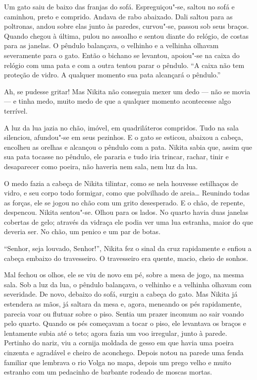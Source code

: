 Um gato saiu de baixo das franjas do sofá. Espreguiçou"-se, saltou no
sofá e caminhou, preto e comprido. Andava de rabo abaixado. Dali saltou
para as poltronas, andou sobre elas junto às paredes, curvou"-se, passou
sob seus braços. Quando chegou à última, pulou no assoalho e sentou
diante do relógio, de costas para as janelas. O pêndulo balançava, o
velhinho e a velhinha olhavam severamente para o gato. Então o bichano se
levantou, apoiou"-se na caixa do relógio com uma pata e com a outra
tentou parar o pêndulo. ``A caixa não tem proteção de vidro. A qualquer
momento sua pata alcançará o pêndulo.''

Ah, se pudesse gritar! Mas Nikita não conseguia mexer um dedo --- não se
movia --- e tinha medo, muito medo de que a qualquer momento acontecesse
algo terrível.

A luz da lua jazia no chão, imóvel, em quadriláteros compridos. Tudo na
sala silenciou, afundou"-se em seus pezinhos. E o gato se esticou,
abaixou a cabeça, encolheu as orelhas e alcançou o pêndulo com a pata.
Nikita sabia que, assim que sua pata tocasse no pêndulo, ele pararia e
tudo iria trincar, rachar, tinir e desaparecer como poeira, não haveria
nem sala, nem luz da lua.

O medo fazia a cabeça de Nikita tilintar, como se nela houvesse estilhaços de vidro, e seu corpo todo formigar, como que polvilhado de areia\ldots{} Reunindo todas as
forças, ele se jogou no chão com um grito desesperado. E o chão, de
repente, despencou. Nikita sentou"-se. Olhou para os lados. No quarto
havia duas janelas cobertas de gelo; através da vidraça ele podia ver uma
lua estranha, maior do que deveria ser. No chão, um penico e um par de
botas.

``Senhor, seja louvado, Senhor!'', Nikita fez o sinal da cruz
rapidamente e enfiou a cabeça embaixo do travesseiro. O travesseiro era
quente, macio, cheio de sonhos.

Mal fechou os olhos, ele se viu de novo em pé, sobre a mesa de jogo, na
mesma sala. Sob a luz da lua, o pêndulo balançava, o velhinho e a
velhinha olhavam com severidade. De novo, debaixo do sofá, surgiu a
cabeça do gato. Mas Nikita já estendera as mãos, já saltara da mesa e,
agora, meneando os pés rapidamente, parecia voar ou flutuar sobre o
piso. Sentia um prazer incomum ao sair voando pelo quarto. Quando os pés
começavam a tocar o piso, ele levantava os braços e lentamente subia até
o teto; agora fazia um voo irregular, junto à parede. Pertinho do nariz,
viu a cornija moldada de gesso em que havia uma poeira cinzenta e
agradável e cheiro de aconchego. Depois notou na parede uma fenda
familiar que lembrava o rio Volga no mapa, depois um prego velho e muito
estranho com um pedacinho de barbante rodeado de moscas mortas.


